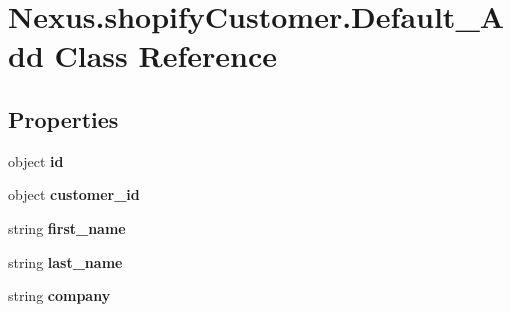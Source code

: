 \hypertarget{class_nexus_1_1shopify_customer_1_1_default___add}{}\section{Nexus.\+shopify\+Customer.\+Default\+\_\+\+Add Class Reference}
\label{class_nexus_1_1shopify_customer_1_1_default___add}
\subsection*{Properties}
\begin{DoxyCompactItemize}
\item 
\mbox{\label{class_nexus_1_1shopify_customer_1_1_default___add_a9643a4d1e72dd0b461dbf1a45d99a1a3}} 
object {\bfseries id}
\item 
\mbox{\label{class_nexus_1_1shopify_customer_1_1_default___add_a76f372d58fbf05d6a448e18da2016389}} 
object {\bfseries customer\+\_\+id}
\item 
\mbox{\label{class_nexus_1_1shopify_customer_1_1_default___add_a10400d3aa7ebb47560d008b88d0daa0c}} 
string {\bfseries first\+\_\+name}
\item 
\mbox{\label{class_nexus_1_1shopify_customer_1_1_default___add_ad84d0ab272ceeac0afdda641ca16d27a}} 
string {\bfseries last\+\_\+name}
\item 
\mbox{\label{class_nexus_1_1shopify_customer_1_1_default___add_ae9359e4ca53ab328986cad8370c6977a}} 
string {\bfseries company}
\item 
\mbox{\label{class_nexus_1_1shopify_customer_1_1_default___add_a5860729a1cdc6193596be78495a80a26}} 

\end{DoxyCompactItemize}
